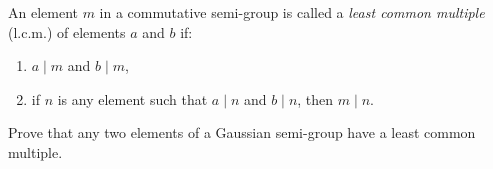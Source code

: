 An element $m$ in a commutative semi-group is called a \textit{least common multiple} (l.c.m.) of elements $a$ and $b$ if:
\begin{enumerate}
  \item $a \mid m$ and $b \mid m$,
  \item if $n$ is any element such that $a \mid n$ and $b \mid n$, then $m \mid n$.
\end{enumerate}

Prove that any two elements of a Gaussian semi-group have a least common multiple.
